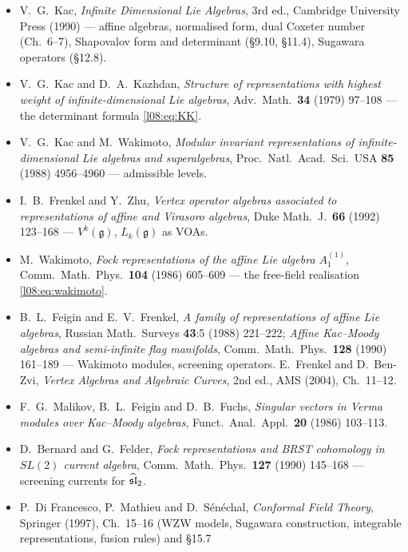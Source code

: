 \begin{sloppypar}
\begin{itemize}[leftmargin=1.5em]
\item V.~G.~Kac, \emph{Infinite Dimensional Lie Algebras}, 3rd ed., Cambridge University Press (1990) ---
  affine algebras, normalised form, dual Coxeter number (Ch.~6--7), Shapovalov form and determinant (\S9.10,
  \S11.4), Sugawara operators (\S12.8).
\item V.~G.~Kac and D.~A.~Kazhdan, \emph{Structure of representations with highest weight of
  infinite-dimensional Lie algebras}, Adv.\ Math.\ \textbf{34} (1979) 97--108 --- the determinant formula
  \eqref{l08:eq:KK}.
\item V.~G.~Kac and M.~Wakimoto, \emph{Modular invariant representations of infinite-dimensional Lie
  algebras and superalgebras}, Proc.\ Natl.\ Acad.\ Sci.\ USA \textbf{85} (1988) 4956--4960 --- admissible levels.
\item I.~B.~Frenkel and Y.~Zhu, \emph{Vertex operator algebras associated to representations of affine
  and Virasoro algebras}, Duke Math.\ J.\ \textbf{66} (1992) 123--168 --- $V^k(\mathfrak g)$, $L_k(\mathfrak g)$ as VOAs.
\item M.~Wakimoto, \emph{Fock representations of the affine Lie algebra $A_1^{(1)}$}, Comm.\ Math.\ Phys.\
  \textbf{104} (1986) 605--609 --- the free-field realisation \eqref{l08:eq:wakimoto}.
\item B.~L.~Feigin and E.~V.~Frenkel, \emph{A family of representations of affine Lie algebras}, Russian
  Math.\ Surveys \textbf{43}:5 (1988) 221--222; \emph{Affine Kac--Moody algebras and semi-infinite flag
  manifolds}, Comm.\ Math.\ Phys.\ \textbf{128} (1990) 161--189 --- Wakimoto modules, screening operators.
  E.~Frenkel and D.~Ben-Zvi, \emph{Vertex Algebras and Algebraic Curves}, 2nd ed., AMS (2004), Ch.~11--12.
\item F.~G.~Malikov, B.~L.~Feigin and D.~B.~Fuchs, \emph{Singular vectors in Verma modules over Kac--Moody
  algebras}, Funct.\ Anal.\ Appl.\ \textbf{20} (1986) 103--113.
\item D.~Bernard and G.~Felder, \emph{Fock representations and BRST cohomology in $SL(2)$ current
  algebra}, Comm.\ Math.\ Phys.\ \textbf{127} (1990) 145--168 --- screening currents for $\widehat{\mathfrak{sl}}_2$.
\item P.~Di Francesco, P.~Mathieu and D.~S\'en\'echal, \emph{Conformal Field Theory}, Springer (1997),
  Ch.~15--16 (WZW models, Sugawara construction, integrable representations, fusion rules) and \S15.7

\end{itemize}
\end{sloppypar}
